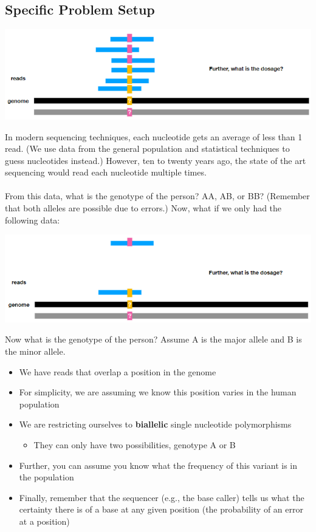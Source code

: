 \documentclass[10pt]{article}
\begin{document}
\subsection*{Specific Problem Setup}
\begin{center}
    \includegraphics*[scale=0.9]{W2_1.png}
\end{center}
In modern sequencing techniques, each nucleotide gets an average of less than 1 read.  (We use data from the general population and statistical techniques to guess nucleotides instead.)  However, ten to twenty years ago, the state of the art sequencing would read each nucleotide multiple times.\\\\
From this data, what is the genotype of the person?  AA, AB, or BB?  (Remember that both alleles are possible due to errors.)  Now, what if we only had the following data:
\begin{center}
    \includegraphics*[scale=0.9]{W2_2.png}
\end{center}
Now what is the genotype of the person?  Assume A is the major allele and B is the minor allele.
\begin{itemize}
    \item We have reads that overlap a position in the genome
    \item For simplicity, we are assuming we know this position varies in the human population
    \item We are restricting ourselves to \textbf{biallelic} single nucleotide polymorphisms
    \begin{itemize}
        \item They can only have two possibilities, genotype A or B
    \end{itemize}
    \item Further, you can assume you know what the frequency of this variant is in the population
    \item Finally, remember that the sequencer (e.g., the base caller) tells us what the certainty there is of a base at any given position (the probability of an error at a position)
\end{itemize}
\end{document}
